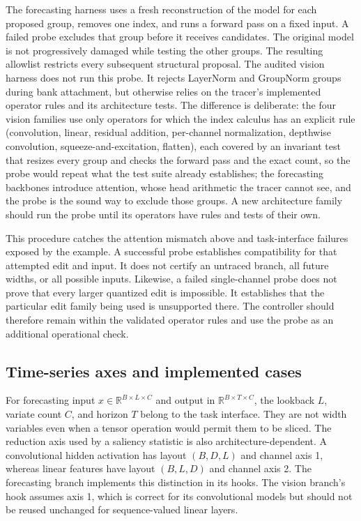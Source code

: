 \documentclass[10pt]{article}
\theoremstyle{paper}
\newcommand{\R}{\mathbb R}
\begin{document}
The forecasting harness uses a fresh reconstruction of the model for each proposed group, removes one index, and runs a forward pass on a fixed input. A failed probe excludes that group before it receives candidates. The original model is not progressively damaged while testing the other groups. The resulting allowlist restricts every subsequent structural proposal. The audited vision harness does not run this probe. It rejects LayerNorm and GroupNorm groups during bank attachment, but otherwise relies on the tracer's implemented operator rules and its architecture tests. The difference is deliberate: the four vision families use only operators for which the index calculus has an explicit rule (convolution, linear, residual addition, per-channel normalization, depthwise convolution, squeeze-and-excitation, flatten), each covered by an invariant test that resizes every group and checks the forward pass and the exact count, so the probe would repeat what the test suite already establishes; the forecasting backbones introduce attention, whose head arithmetic the tracer cannot see, and the probe is the sound way to exclude those groups. A new architecture family should run the probe until its operators have rules and tests of their own.

This procedure catches the attention mismatch above and task-interface failures exposed by the example. A successful probe establishes compatibility for that attempted edit and input. It does not certify an untraced branch, all future widths, or all possible inputs. Likewise, a failed single-channel probe does not prove that every larger quantized edit is impossible. It establishes that the particular edit family being used is unsupported there. The controller should therefore remain within the validated operator rules and use the probe as an additional operational check.

\subsection{Time-series axes and implemented cases}
\label{app:timeseries}
For forecasting input $x\in\R^{B\times L\times C}$ and output in $\R^{B\times T\times C}$, the lookback $L$, variate count $C$, and horizon $T$ belong to the task interface. They are not width variables even when a tensor operation would permit them to be sliced. The reduction axis used by a saliency statistic is also architecture-dependent. A convolutional hidden activation has layout $(B,D,L)$ and channel axis 1, whereas linear features have layout $(B,L,D)$ and channel axis 2. The forecasting branch implements this distinction in its hooks. The vision branch's hook assumes axis 1, which is correct for its convolutional models but should not be reused unchanged for sequence-valued linear layers.
\end{document}
